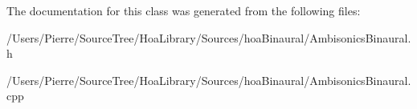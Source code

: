 The documentation for this class was generated from the following files\-:\begin{DoxyCompactItemize}
\item 
/\-Users/\-Pierre/\-Source\-Tree/\-Hoa\-Library/\-Sources/hoa\-Binaural/Ambisonics\-Binaural.\-h\item 
/\-Users/\-Pierre/\-Source\-Tree/\-Hoa\-Library/\-Sources/hoa\-Binaural/Ambisonics\-Binaural.\-cpp\end{DoxyCompactItemize}
